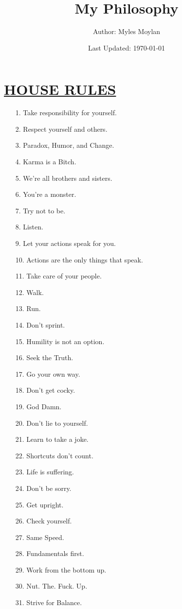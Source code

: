 \documentclass[11pt]{article}
\title{	
	\normalfont \normalsize 
	\huge My Philosophy
}
\author{Author: Myles Moylan}
\date{Last Updated: \normalsize\today}
\begin{document}
\maketitle
\section*{\ul{HOUSE RULES}}
\begin{enumerate}
	\item[1.] Take responsibility for yourself.
	\item[2.] Respect yourself and others.
	\item[3.] Paradox, Humor, and Change.
	\item[4.] Karma is a Bitch.
	\item[5.] We're all brothers and sisters.
	\item[6.] You're a monster.
	\item[7.] Try not to be.
	\item[8.] Listen.
	\item[9.] Let your actions speak for you.
	\item[10.] Actions are the only things that speak.
	\item[11.] Take care of your people.
	\item[12.] Walk.
	\item[13.] Run.
	\item[14.] Don't sprint.
	\item[15.] Humility is not an option.
	\item[16.] Seek the Truth.
	\item[17.] Go your own way.
	\item[18.] Don't get cocky.
	\item[19.] God Damn.
	\item[20.] Don't lie to yourself.
	\item[21.] Learn to take a joke.
	\item[22.] Shortcuts don't count.
	\item[23.] Life is suffering.
	\item[24.] Don't be sorry.
	\item[25.] Get upright.
	\item[26.] Check yourself.
	\item[27.] Same Speed.
	\item[28.] Fundamentals first.
	\item[29.] Work from the bottom up.
	\item[30.] Nut. The. Fuck. Up.
	\item[31.] Strive for Balance.

\end{enumerate}
\end{document}
